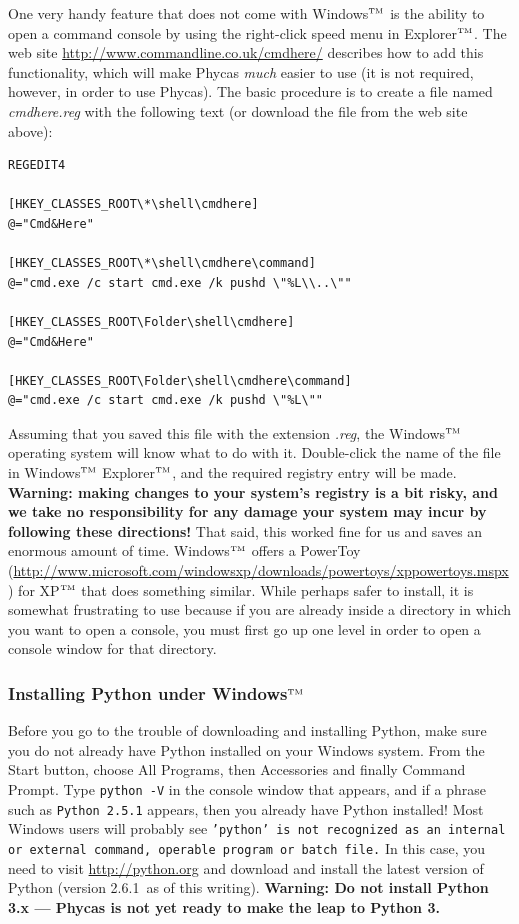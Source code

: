 \documentclass[10pt]{article}
\newcommand{\currPyVersion}{2.6.1}
\newcommand{\trademark}[1]{#1${}^{\mbox{\tiny TM}}$}
\newcommand{\pathname}[1]{{\em #1}}				%
\newcommand{\menu}[1]{{\sf #1}}					%
\newcommand{\code}[1]{{\tt #1}}					%
\newcommand{\warning}[1]{{\bf Warning: #1}}		%
\newcommand{\warnNoPyThree}{\warning{Do not install Python 3.x --- Phycas is not yet ready to make the leap to Python 3.}}
\begin{document}
One very handy feature that does not come with \trademark{Windows} is the ability to open a command console by using the right-click speed menu in \trademark{Explorer}. The web site \url{http://www.commandline.co.uk/cmdhere/} describes how to add this functionality, which will make Phycas {\em much} easier to use (it is not required, however, in order to use Phycas). The basic procedure is to create a file named \pathname{cmdhere.reg} with the following text (or download the file from the web site above):
%
\begin{verbatim}
REGEDIT4

[HKEY_CLASSES_ROOT\*\shell\cmdhere]
@="Cmd&Here"

[HKEY_CLASSES_ROOT\*\shell\cmdhere\command]
@="cmd.exe /c start cmd.exe /k pushd \"%L\\..\""

[HKEY_CLASSES_ROOT\Folder\shell\cmdhere]
@="Cmd&Here"

[HKEY_CLASSES_ROOT\Folder\shell\cmdhere\command]
@="cmd.exe /c start cmd.exe /k pushd \"%L\""
\end{verbatim}
%
Assuming that you saved this file with the extension \pathname{.reg}, the \trademark{Windows} operating system will know what to do with it. Double-click the name of the file in \trademark{Windows} \trademark{Explorer}, and the required registry entry will be made. \warning{making changes to your system's registry is a bit risky, and we take no responsibility for any damage your system may incur by following these directions!} That said, this worked fine for us and saves an enormous amount of time. \trademark{Windows} offers a PowerToy (\url{http://www.microsoft.com/windowsxp/downloads/powertoys/xppowertoys.mspx}) for \trademark{XP} that does something similar. While perhaps safer to install, it is somewhat frustrating to use because if you are already inside a directory in which you want to open a console, you must first go up one level in order to open a console window for that directory.

\subsubsection{Installing Python under \trademark{Windows}}

Before you go to the trouble of downloading and installing Python, make sure you do not already have Python installed on your Windows system. From the Start button, choose \menu{All Programs}, then \menu{Accessories} and finally \menu{Command Prompt}. Type \code{python -V} in the console window that appears, and if a phrase such as \code{Python 2.5.1} appears, then you already have Python installed! Most Windows users will probably see \code{'python' is not recognized as an internal or external command, operable program or batch file.} In this case, you need to visit \url{http://python.org} and download and install the latest version of Python (version \currPyVersion\ as of this writing). \warnNoPyThree
\end{document}

